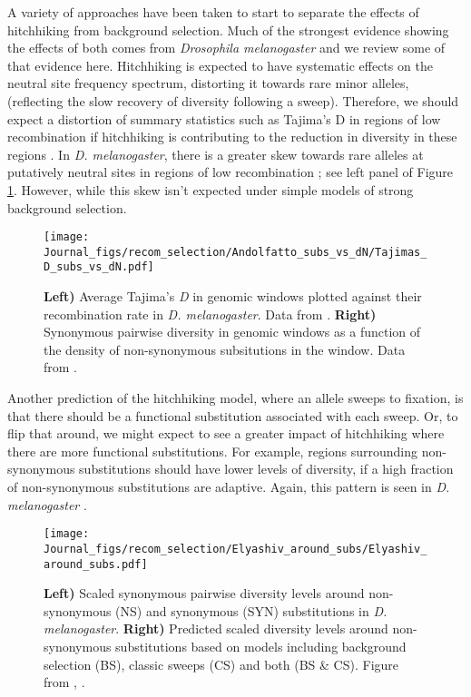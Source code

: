 A variety of approaches have been taken to start to separate the effects of hitchhiking from background
selection. Much of the
strongest evidence showing the effects of both comes from
\textit{Drosophila melanogaster} and we review some of that evidence here. 
Hitchhiking is expected to have systematic effects on the neutral site
frequency spectrum, distorting it towards rare minor alleles,
(reflecting the slow recovery of diversity following a
sweep). Therefore, we should expect a distortion of summary
statistics such as Tajima's D in regions of low recombination if
hitchhiking is contributing to the reduction in diversity in these
regions \citep{Braverman:95, Przeworski:02,Kim:06}. In \textit{D. melanogaster}, there is a greater skew towards rare
alleles at putatively neutral sites in regions of low recombination
\citep{Andolfatto:01,Shapiro:07}; see left panel of Figure
\ref{fig:Tajimas_D_dN_pi}. However, while this skew isn't expected under
simple models of strong background selection.

\begin{figure}
\begin{center}
\texttt{[image: Journal\_figs/recom\_selection/Andolfatto\_subs\_vs\_dN/Tajimas\_D\_subs\_vs\_dN.pdf]}
\end{center}
\caption{{\bf Left)} Average Tajima's {\it D} in genomic windows plotted
  against their recombination rate in \textit{D. melanogaster}. Data
  from \citet{Shapiro:07}. {\bf Right)} Synonymous pairwise diversity
  in genomic windows  as a function of the density of non-synonymous
  subsitutions in the window. Data from \citet{Andolfatto:07}. } \label{fig:Tajimas_D_dN_pi}
\end{figure}

Another prediction of the hitchhiking model, where an allele sweeps to
fixation, is that there should be a functional substitution associated with each
sweep. Or, to flip that around, we might expect to see a greater impact
of hitchhiking where there are more functional substitutions. 
For example, regions surrounding non-synonymous substitutions should have lower levels of
diversity, if a high fraction of non-synonymous substitutions are adaptive. Again, this pattern is seen in \textit{D. melanogaster}
\citep[][, right side of
Figure \ref{fig:Tajimas_D_dN_pi}]{Andolfatto:07, Macpherson:07,Sattath:11}.

\begin{figure}
\begin{center}
\texttt{[image: Journal\_figs/recom\_selection/Elyashiv\_around\_subs/Elyashiv\_around\_subs.pdf]}
\end{center}
\caption{ {\bf Left) }  Scaled synonymous pairwise diversity levels around non-synonymous
  (NS) and synonymous (SYN) substitutions in {\it
    D. melanogaster}. {\bf Right)} Predicted scaled diversity levels
  around non-synonymous substitutions based on models including
  background selection (BS), classic sweeps (CS) and both (BS \&
  CS). Figure from \citet{elyashiv2016genomic}, \PLOSccBY.} \label{fig:Elyashiv_around_subs}
\end{figure}

